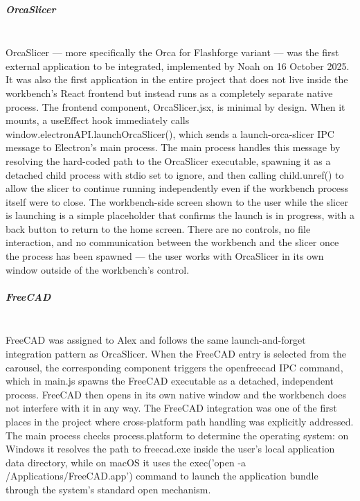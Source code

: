 \documentclass[a4paper,12pt]{article}
\begin{document}
\subparagraph{OrcaSlicer}\mbox{} \\
OrcaSlicer\cite{orcaslicer} — more specifically the Orca for Flashforge variant — was the first external application to be integrated, implemented by Noah on 16 October 2025. It was also the first application in the entire project that does not live inside the workbench's React frontend but instead runs as a completely separate native process.
The frontend component, OrcaSlicer.jsx, is minimal by design. When it mounts, a useEffect hook immediately calls window.electronAPI.launchOrcaSlicer(), which sends a launch-orca-slicer IPC message to Electron's main process. The main process handles this message by resolving the hard-coded path to the OrcaSlicer executable, spawning it as a detached child process with stdio set to ignore, and then calling child.unref() to allow the slicer to continue running independently even if the workbench process itself were to close. The workbench-side screen shown to the user while the slicer is launching is a simple placeholder that confirms the launch is in progress, with a back button to return to the home screen. There are no controls, no file interaction, and no communication between the workbench and the slicer once the process has been spawned — the user works with OrcaSlicer in its own window outside of the workbench's control.
\newpage
\subparagraph{FreeCAD}\mbox{} \\
FreeCAD\cite{freecad} was assigned to Alex and follows the same launch-and-forget integration pattern as OrcaSlicer. 
When the FreeCAD entry is selected from the carousel, the corresponding component triggers the openfreecad IPC command, which in main.js spawns the FreeCAD executable as a detached, independent process. 
FreeCAD then opens in its own native window and the workbench does not interfere with it in any way.
The FreeCAD integration was one of the first places in the project where cross-platform path handling was explicitly addressed. 
The main process checks process.platform to determine the operating system: on Windows it resolves the path to freecad.exe inside the user's local application data directory, while on macOS it uses the exec('open -a /Applications/FreeCAD.app') command to launch the application bundle through the system's standard open mechanism. 
\end{document}

